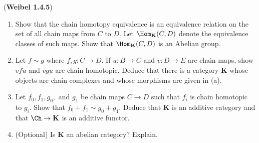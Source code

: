 \documentclass[12pt]{article}
\begin{document}
\begin{prob}
	(\textbf{Weibel 1.4.5}) 
	\begin{enumerate}
		\item Show that the chain homotopy equivalence is an equivalence relation on the set of all chain maps from $C$
		to $D$. Let $\Hom_\mathbf{K}(C,D)$ denote the equivalence classes of such maps. Show that $\Hom_\mathbf{K}(C,D)$
		is an Abelian group.
		\item Let $f\sim g$ where $f,g:C\to D$. If $u:B\to C$ and $v:D\to E$ are chain maps, show $vfu$ and $vgu$ are 
		chain homotopic. Deduce that there is a category $\mathbf K$ whose objects are chain complexes and whose morphisms
		are given in (a).
		\item Let $f_0,f_1,g_0,$ and $g_1$ be chain maps $C\to D$ such that $f_i$ is chain homotopic to $g_i$. Show that 
		$f_0+f_1\sim g_0+g_1$. Deduce that $\mathbf K$ is an additive category and that $\Ch\to\mathbf K$ is an 
		additive functor.
		\item (Optional) Is $\mathbf K$ an abelian category? Explain.
	\end{enumerate}
\end{prob}
\end{document}
